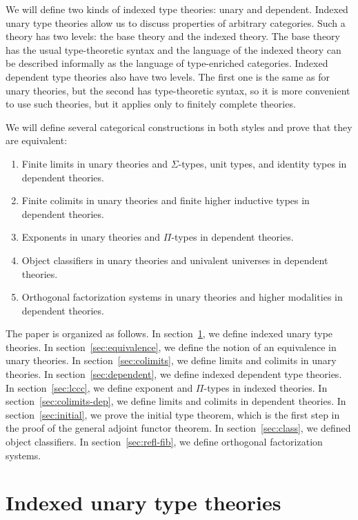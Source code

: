 \documentclass[reqno]{amsart}
\theoremstyle{definition}
\theoremstyle{remark}
\numberwithin{figure}{section}
\begin{document}
We will define two kinds of indexed type theories: unary and dependent.
Indexed unary type theories allow us to discuss properties of arbitrary categories.
Such a theory has two levels: the base theory and the indexed theory.
The base theory has the usual type-theoretic syntax and the language of the indexed theory can be described informally as the language of type-enriched categories.
Indexed dependent type theories also have two levels.
The first one is the same as for unary theories, but the second has type-theoretic syntax, so it is more convenient to use such theories, but it applies only to finitely complete theories.

We will define several categorical constructions in both styles and prove that they are equivalent:
\begin{enumerate}
\item Finite limits in unary theories and $\Sigma$-types, unit types, and identity types in dependent theories.
\item Finite colimits in unary theories and finite higher inductive types in dependent theories.
\item Exponents in unary theories and $\Pi$-types in dependent theories.
\item Object classifiers in unary theories and univalent universes in dependent theories.
\item Orthogonal factorization systems in unary theories and higher modalities in dependent theories.
\end{enumerate}

The paper is organized as follows.
In section~\ref{sec:unary}, we define indexed unary type theories.
In section~\ref{sec:equivalence}, we define the notion of an equivalence in unary theories.
In section~\ref{sec:colimits}, we define limits and colimits in unary theories.
In section~\ref{sec:dependent}, we define indexed dependent type theories.
In section~\ref{sec:lccc}, we define exponent and $\Pi$-types in indexed theories.
In section~\ref{sec:colimits-dep}, we define limits and colimits in dependent theories.
In section~\ref{sec:initial}, we prove the initial type theorem, which is the first step in the proof of the general adjoint functor theorem.
In section~\ref{sec:class}, we defined object classifiers.
In section~\ref{sec:refl-fib}, we define orthogonal factorization systems.

\section{Indexed unary type theories}
\label{sec:unary}
\end{document}
